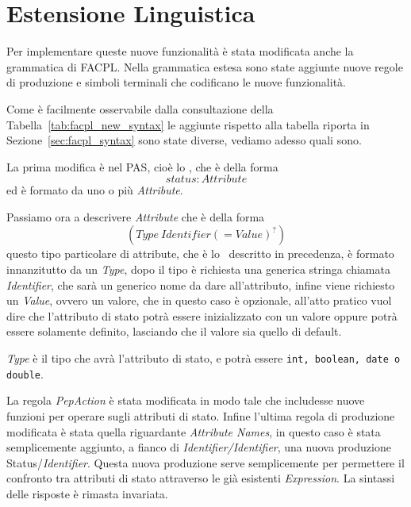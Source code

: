 \section{Estensione Linguistica} %
\label{sec:estensione_linguistica}
Per implementare queste nuove funzionalità è stata modificata anche la grammatica di \ac{FACPL}.
Nella grammatica estesa sono state aggiunte nuove regole di produzione e simboli terminali che 
codificano le nuove funzionalità. \par

Come è facilmente osservabile dalla consultazione della Tabella~\ref{tab:facpl_new_syntax} le aggiunte rispetto alla tabella riporta in Sezione~\ref{sec:facpl_syntax} sono state diverse, vediamo adesso quali sono. \par
La prima modifica è nel \ac{PAS}, cioè  lo \status, che è della forma $$status: Attribute$$ ed è formato da uno o più \textit{Attribute}. \par
Passiamo ora a descrivere \textit{Attribute} che è della forma $$(Type\ Identifier (= Value)^?)$$
questo tipo particolare di attribute, che è lo \statusattribute \ descritto in precedenza, è formato innanzitutto da un \textit{Type}, dopo il tipo è richiesta una generica stringa chiamata \textit{Identifier}, che sarà un generico nome da dare all'attributo, infine viene richiesto un \textit{Value}, ovvero un valore, che in questo caso è opzionale, all'atto pratico vuol dire che l'attributo di stato potrà essere inizializzato con un valore oppure potrà essere solamente definito, lasciando che il valore sia quello di default.

\textit{Type} è il tipo che avrà l'attributo di stato, e potrà essere \texttt{int, boolean, date o double}. \par
La regola \textit{PepAction} è stata modificata in modo tale che includesse nuove funzioni per operare sugli attributi di stato.
Infine l'ultima regola di produzione modificata è stata quella riguardante \textit{Attribute Names}, in questo caso è stata semplicemente aggiunto, a fianco di \textit{Identifier/Identifier}, una nuova produzione Status/\textit{Identifier}. Questa nuova produzione serve semplicemente per permettere il confronto tra attributi di stato attraverso le già esistenti \textit{Expression}.
La sintassi delle risposte è rimasta invariata.


